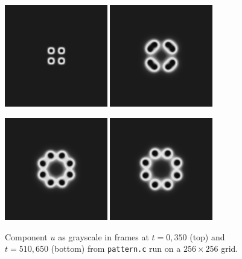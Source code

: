 \begin{figure}
\includegraphics[width=0.4\textwidth]{figs/pattern000} \qquad
\includegraphics[width=0.4\textwidth]{figs/pattern350}

\smallskip
\includegraphics[width=0.4\textwidth]{figs/pattern510} \qquad
\includegraphics[width=0.4\textwidth]{figs/pattern650}
%    
\caption{Component $u$ as grayscale in frames at $t=0,350$ (top) and $t=510,650$ (bottom) from \texttt{pattern.c} run on a $256\times 256$ grid.}
\label{fig:ts:pattern:figureversuspearson}
\end{figure}

